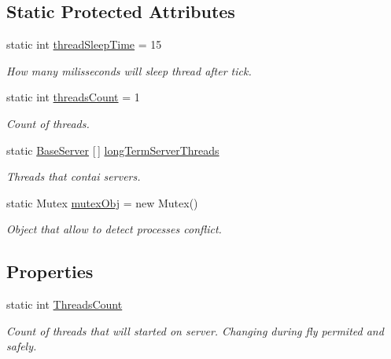 \subsection*{Static Protected Attributes}
\begin{DoxyCompactItemize}
\item 
static int \mbox{\hyperlink{class_uniform_server_1_1_base_server_a4dbe04636a763decfae22ddb2fe26c7a}{thread\+Sleep\+Time}} = 15
\begin{DoxyCompactList}\small\item\em How many milisseconds will sleep thread after tick. \end{DoxyCompactList}\item 
static int \mbox{\hyperlink{class_uniform_server_1_1_base_server_aa40c02a1eec7eda4c36a8ac08119b414}{threads\+Count}} = 1
\begin{DoxyCompactList}\small\item\em Count of threads. \end{DoxyCompactList}\item 
static \mbox{\hyperlink{class_uniform_server_1_1_base_server}{Base\+Server}} \mbox{[}$\,$\mbox{]} \mbox{\hyperlink{class_uniform_server_1_1_base_server_a9c14e919da0c2b9b7f8e57a92c9b0742}{long\+Term\+Server\+Threads}}
\begin{DoxyCompactList}\small\item\em Threads that contai servers. \end{DoxyCompactList}\item 
static Mutex \mbox{\hyperlink{class_uniform_server_1_1_base_server_a051bdce3aec037df76d8efe3b9938198}{mutex\+Obj}} = new Mutex()
\begin{DoxyCompactList}\small\item\em Object that allow to detect processes conflict. \end{DoxyCompactList}\end{DoxyCompactItemize}
\subsection*{Properties}
\begin{DoxyCompactItemize}
\item 
static int \mbox{\hyperlink{class_uniform_server_1_1_base_server_a31cc7d436bb2dd344ec275fd0fa0061e}{Threads\+Count}}
\begin{DoxyCompactList}\small\item\em Count of threads that will started on server. Changing during fly permited and safely. \end{DoxyCompactList}\end{DoxyCompactItemize}
